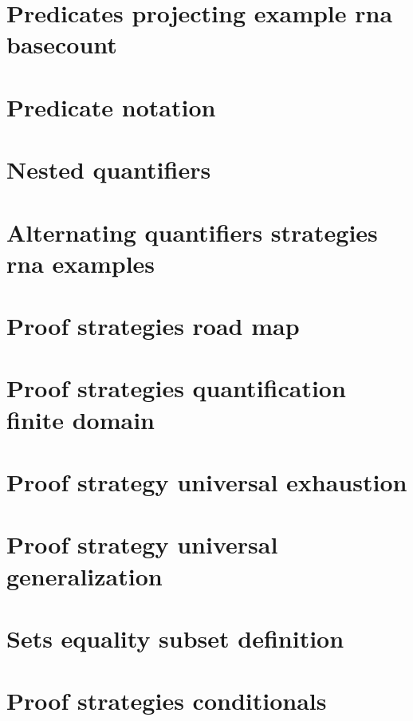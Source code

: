 \section*{Predicates projecting example rna basecount}

\vfill
\section*{Predicate notation}

\vfill
\section*{Nested quantifiers}

\vfill
\section*{Alternating quantifiers strategies rna examples}

\vfill
\section*{Proof strategies road map}

\vfill
\section*{Proof strategies quantification finite domain}

\vfill
\section*{Proof strategy universal exhaustion}

\vfill
\section*{Proof strategy universal generalization}

\vfill
\section*{Sets equality subset definition}

\vfill
\section*{Proof strategies conditionals}

\vfill
